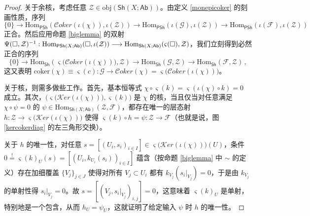 \begin{proof}
关于余核，考虑任意 $\mathcal{Z}\in\text{obj}(\mathsf{Sh}(X;\mathsf{Ab}))$。由定义 \ref{monepicoker} 的刻画性质，序列
\[
\{0\}\!\rightarrow\!\text{Hom}_{\mathsf{PSh}}(\mathcal{C}oker(\iota(\chi)),\iota(\mathcal{Z}))\!\rightarrow\!\text{Hom}_{\mathsf{PSh}}(\iota(\mathcal{G}),\iota(\mathcal{Z}))\!\rightarrow\!\text{Hom}_{\mathsf{PSh}}(\iota(\mathcal{F}),\iota(\mathcal{Z}))
\]
正合。然后应用命题 \ref{biglemma} 的双射 $\Psi(\square,\mathcal{Z})^{-1}:\textup{Hom}_{\mathsf{PSh}(X;\mathsf{Ab})}(\square,\iota(\mathcal{Z}))\longrightarrow\break \textup{Hom}_{\mathsf{Sh}(X;\mathsf{Ab})}(\varsigma(\square),\mathcal{Z})$，我们立刻得到必然正合的序列
\[
\{0\}\rightarrow\text{Hom}_{\mathsf{Sh}}(\varsigma\big(\mathcal{C}oker(\iota(\chi))\big),\mathcal{Z})\rightarrow\text{Hom}_{\mathsf{Sh}}(\mathcal{G},\mathcal{Z})\rightarrow\text{Hom}_{\mathsf{Sh}}(\mathcal{F},\mathcal{Z})\,,
\]
这又表明 $\text{coker}(\chi)\equiv\varsigma(c):\mathcal{G}\rightarrow\mathcal{C}oker(\chi)=\varsigma\big(\mathcal{C}oker(\iota(\chi))\big)$。

关于核，则需多做些工作。首先，基本恒等式 $\chi\circ\varsigma(k)=\varsigma(\iota(\chi)\circ k)=0$ 成立。其次，$\big(\varsigma\big(\mathcal{K}er(\iota(\chi))\big),\varsigma(k)\big)$ 是 $\chi$ 的核，当且仅当对任意满足 $\chi\circ\psi=0$ 的 $\psi\in\text{Hom}_{\mathsf{Sh}(X;\mathsf{Ab})}(\mathcal{Z},\mathcal{F})$，都存在唯一的层态射 $h:\mathcal{Z}\rightarrow \varsigma\big(\mathcal{K}er(\iota(\chi))\big)$ 使得 $\varsigma(k)\circ h=\psi:\mathcal{Z}\rightarrow\mathcal{F}$（也就是说，图 \eqref{kercokerdiag} 的左三角形交换）。

关于 $h$ 的唯一性，对任意 $s=[(U_i,s_i)_{i\in I}]\in\varsigma\big(\mathcal{K}er(\iota(\chi))\big)(U)$，条件 $0\overset{!}{=}\varsigma(k)_U(s)=[(U_i,k_{U_i}(s_i))_{i\in I}]$ 蕴含（按命题 \ref{biglemma} 中 $\sim$ 的定义）存在加细覆盖 $\{V_j\}_{j\in J}$ 使得对所有 $V_j\subset U_i$ 都有 $k_{V_j}(s_i|_{V_j})=0$，于是由 $k_{V_j}$ 的单射性得 $s_i|_{V_j}=0$。故 $s=[(V_j,s_i|_{V_j})_{i,j}]=0$，这意味着 $\varsigma(k)_U$ 是单射，特别地是一个包含，从而 $h_U=\psi_U$，这就证明了给定输入 $\psi$ 时 $h$ 的唯一性。


\end{proof}
